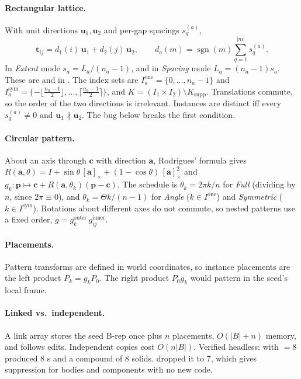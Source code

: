 \paragraph{Rectangular lattice.} With unit directions $\mathbf u_1,\mathbf u_2$ and per-gap spacings
$s^{(a)}_q$,
\[
  \mathbf t_{ij} = d_1(i)\,\mathbf u_1 + d_2(j)\,\mathbf u_2,\qquad
  d_a(m) = \operatorname{sgn}(m)\sum_{q=1}^{|m|} s^{(a)}_q .
\]
In \emph{Extent} mode $s_a = L_a/(n_a-1)$, and in \emph{Spacing} mode $L_a=(n_a-1)s_a$. These are
 and  in . The index sets are
$I_a^{\text{one}}=\{0,\dots,n_a-1\}$ and $I_a^{\text{sym}}=\{-\lfloor\tfrac{n_a-1}{2}\rfloor,\dots,\lceil\tfrac{n_a-1}{2}\rceil\}$,
and $K=(I_1\times I_2)\setminus K_{\text{supp}}$. Translations commute, so the order of the two directions is
irrelevant. Instances are distinct iff every $s^{(a)}_q\neq0$ and $\mathbf u_1\nparallel\mathbf u_2$. The
bug below breaks the first condition.

\paragraph{Circular pattern.} About an axis through $\mathbf c$ with direction $\mathbf a$, Rodrigues'
formula gives
$R(\mathbf a,\theta) = I + \sin\theta\,[\mathbf a]_\times + (1-\cos\theta)\,[\mathbf a]_\times^2$ and
$g_k:\mathbf p\mapsto\mathbf c+R(\mathbf a,\theta_k)(\mathbf p-\mathbf c)$. The schedule is
$\theta_k = 2\pi k/n$ for \emph{Full} (dividing by $n$, since $2\pi\equiv0$), and
$\theta_k=\Theta k/(n-1)$ for \emph{Angle} ($k\in I^{\text{one}}$) and \emph{Symmetric}
($k\in I^{\text{sym}}$). Rotations about different axes do not commute, so nested patterns use a fixed
order, $g=g^{\text{outer}}_k\,g^{\text{inner}}_{ij}$.

\paragraph{Placements.} Pattern transforms are defined in world coordinates, so instance placements are
the left product $P_k=g_kP_0$. The right product $P_0g_k$ would pattern in the seed's local frame.

\paragraph{Linked vs.\ independent.} A link array stores the seed B-rep once plus $n$ placements,
$O(|B|+n)$ memory, and follows edits. Independent copies cost $O(n|B|)$. Verified headless:
 with $=8$ produced 8 s and a compound of 8
solids.  dropped it to 7, which gives suppression for bodies and
components with no new code.

